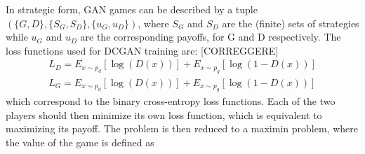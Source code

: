 In strategic form, GAN games can be described by a tuple $(\{G, D\}, \{S_G, S_D\}, \{u_G, u_D\})$, where $S_G$ and $S_D$ are the (finite) sets of strategies while $u_G$ and $u_D$ are the corresponding payoffs, for G and D respectively.
The loss functions used for DCGAN training are: [CORREGGERE]
\begin{align*}
	L_D = E_{x \sim p_d}[\log(D(x))]+E_{x \sim p_g}[\log(1-D(x))]\\
	L_G = E_{x \sim p_d}[\log(D(x))]+E_{x \sim p_g}[\log(1-D(x))]
\end{align*}
which correspond to the binary cross-entropy loss functions. Each of the two players should then minimize its own loss function, which is equivalent to maximizing its payoff. The problem is then reduced to a maximin problem, where the value of the game is defined as 